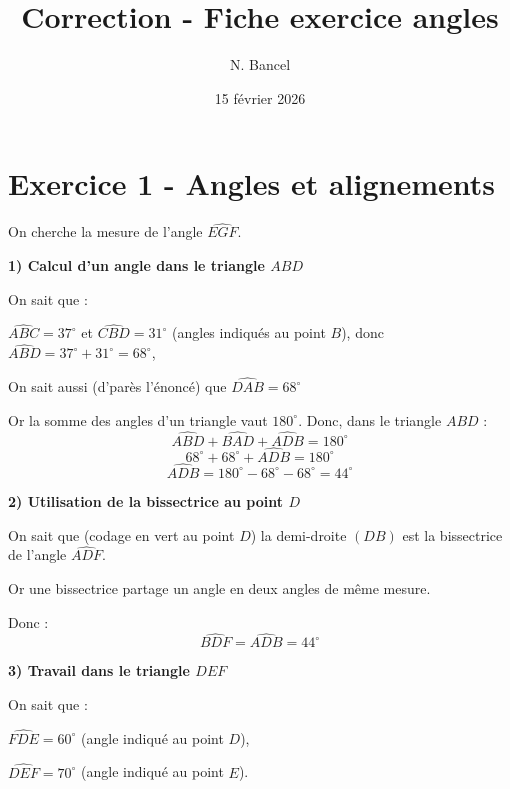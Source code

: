 \documentclass[answers]{exam}
\title{Correction - Fiche exercice angles}
\author{N. Bancel}
\date{15 février 2026}
\begin{document}
{\let\newpage\relax\maketitle}

\section*{Exercice 1 - Angles et alignements}


\begin{solution}

On cherche la mesure de l'angle $\widehat{EGF}$.

\textbf{1) Calcul d'un angle dans le triangle $ABD$}

On sait que :
\begin{compactitem}
\item $\widehat{ABC}=37^\circ$ et $\widehat{CBD}=31^\circ$ (angles indiqués au point $B$), donc $\widehat{ABD}=37^\circ+31^\circ=68^\circ$,
\item On sait aussi (d'parès l'énoncé) que $\widehat{DAB}=68^\circ$
\end{compactitem}

Or la somme des angles d'un triangle vaut $180^\circ$. Donc, dans le triangle $ABD$ :
\[
\widehat{ABD} + \widehat{BAD} + \widehat{ADB} = 180^\circ
\]
\[
68^\circ + 68^\circ + \widehat{ADB} = 180^\circ
\]
\[
\widehat{ADB} = 180^\circ - 68^\circ - 68^\circ = 44^\circ
\]

\medskip

\textbf{2) Utilisation de la bissectrice au point $D$}

On sait que (codage en vert au point $D$) la demi-droite $(DB)$ est la bissectrice de l'angle $\widehat{ADF}$.

Or une bissectrice partage un angle en deux angles de même mesure.

Donc :
\[
\widehat{BDF} = \widehat{ADB} = 44^\circ
\]

\medskip

\textbf{3) Travail dans le triangle $DEF$}

On sait que :
\begin{compactitem}
\item $\widehat{FDE} = 60^\circ$ (angle indiqué au point $D$),
\item $\widehat{DEF} = 70^\circ$ (angle indiqué au point $E$).
\end{compactitem}


\end{solution}
\end{document}
